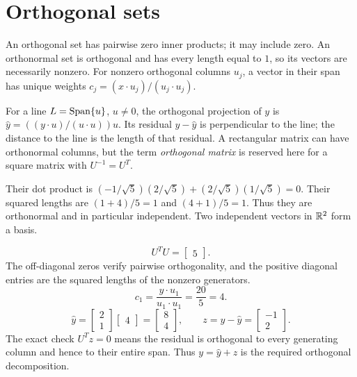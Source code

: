 \section{Orthogonal sets}
An orthogonal set has pairwise zero inner products; it may include zero.
An orthonormal set is orthogonal and has every length equal to $1$, so
its vectors are necessarily nonzero. For nonzero orthogonal columns
$u_j$, a vector in their span has unique weights
$c_j=(x\cdot u_j)/(u_j\cdot u_j)$.

For a line $L=\operatorname{Span}\{u\}$, $u\ne0$, the orthogonal projection of $y$
is $\widehat y=((y\cdot u)/(u\cdot u))u$.
Its residual $y-\widehat y$ is perpendicular to the line; the distance
to the line is the length of that residual. A rectangular matrix can
have orthonormal columns, but the term \emph{orthogonal matrix} is
reserved here for a square matrix with $U^{-1}=U^T$.

Their dot product is $(-1/\sqrt5)(2/\sqrt5)+(2/\sqrt5)(1/\sqrt5)=0$.
Their squared lengths are $(1+4)/5=1$ and $(4+1)/5=1$.
Thus they are orthonormal and in particular independent. Two independent
vectors in $\mathbb{R}^2$ form a basis.

\[U^TU=\left[\begin{array}{r}5\end{array}\right].\]
The off-diagonal zeros verify pairwise orthogonality, and the positive diagonal entries are the squared lengths of the nonzero generators.
\[c_{1}=\frac{y\cdot u_{1}}{u_{1}\cdot u_{1}}=\frac{20}{5}=4.\]
\[\widehat y=\left[\begin{array}{r}2\\1\end{array}\right]\left[\begin{array}{r}4\end{array}\right]=\left[\begin{array}{r}8\\4\end{array}\right],\qquad z=y-\widehat y=\left[\begin{array}{r}-1\\2\end{array}\right].\]
The exact check $U^Tz=0$ means the residual is orthogonal to every generating column and hence to their entire span. Thus $y=\widehat y+z$ is the required orthogonal decomposition.

